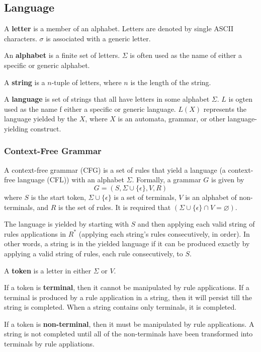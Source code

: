 \documentclass{article}
\newcommand{\definition}[1]{
	\vspace{10px}
	\noindent {[\sc Definition]} #1
	\vspace{10px}
}
\begin{document}
\subsection{Language}

	\definition{A \textbf{letter} is a member of an alphabet. Letters are denoted by single ASCII characters. $\sigma$ is associated with a generic letter.}

	\definition{An \textbf{alphabet} is a finite set of letters. $\Sigma$ is often used as the name of either a specific or generic alphabet.}

	\definition{A \textbf{string} is a $n$-tuple of letters, where $n$ is the length of the string.}

	\definition{A \textbf{language} is set of strings that all have letters in some alphabet $\Sigma$. $L$ is ogten used as the name f either a specific or generic language. $L(X)$ represents the language yielded by the $X$, where $X$ is an automata, grammar, or other language-yielding construct.}

\subsubsection{Context-Free Grammar}

	\definition{A context-free grammar (CFG) is a set of rules that yield a language (a context-free language (CFL)) with an alphabet $\Sigma$. Formally, a grammar $G$ is given by \[
		G = (S, \Sigma \cup \{ \epsilon \}, V, R)
	\] where $S$ is the start token, $\Sigma \cup \{ \epsilon \}$ is a set of terminals, $V$ is an alphabet of non-terminals, and $R$ is the set of rules. It is required that $(\Sigma \cup \{\epsilon\} \cap V = \varnothing)$.}

	The language is yielded by starting with $S$ and then applying each valid string of rules applications in $R^*$ (applying each string's rules consecutively, in order). In other words, a string is in the yielded language if it can be produced exactly by applying a valid string of rules, each rule consecutively, to $S$.

	\definition{A \textbf{token} is a letter in either $\Sigma$ or $V$.}

	\definition{If a token is \textbf{terminal}, then it cannot be manipulated by rule applications. If a terminal is produced by a rule application in a string, then it will persist till the string is completed. When a string contains only terminals, it is completed.}

	\definition{If a token is \textbf{non-terminal}, then it must be manipulated by rule applications. A string is not completed until all of the non-terminals have been transformed into terminals by rule appliations.}
\end{document}
